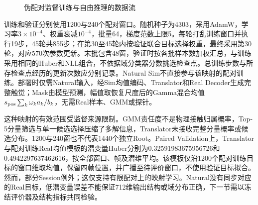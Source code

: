 \begin{figure}[htbp]
 \centering
 \caption{伪配对监督训练与自由推理的数据流}
 \label{fig:ch05_translator_paths}
\end{figure}

训练和验证分别使用1200与240个配对窗口。随机种子为4303，采用AdamW，学习率$3\times10^{-4}$、权重衰减$10^{-4}$，批量64，梯度范数上限5。每轮打乱训练窗口并执行19步，45轮共855步；在第30至45轮内按验证联合目标选择权重，最终采用第30轮，对应570次参数更新。末批包含48窗，验证时按各批样本数加权汇总，与训练采用相同的Huber和NLL组合，不依据域分类器分数挑选检查点。总训练步数与所存检查点经历的更新次数应分别记录。Natural Sim不直接参与该映射的配对训练。部署时仅需Natural输入，经Sim均值编码、Translator和Real Decoder生成完整触觉；Mask由模型预测，幅值取恢复尺度后的Gamma混合均值$s_{\rm pos}\sum_k\omega_k a_k/b_k$，无需Real样本、GMM或探针。

这种映射的有效范围受监督来源限制。GMM责任度不是物理接触归属概率，Top-5分量筛选与单一候选选择压缩了多解信息，Translator未接收完整分量概率或候选分布。1200与240窗也不代表1440个独立Root。Paired Validation上，Translator与配对训练Real均值模板的潜变量Huber分别为0.32591983675956726和0.4942297637462616，按全部窗口、帧及潜维平均。该模板仅沿1200个配对训练目标的窗口维取均值，保留四帧位置，并广播至待评价窗口，不使用验证目标拟合。然而，部分Session例外；这仅支持有限配对上的映射学习。Natural没有同步对应的Real目标，低潜变量误差不能保证712维输出结构或域分布正确，下一节需以冻结评价器及结构指标共同检验。
